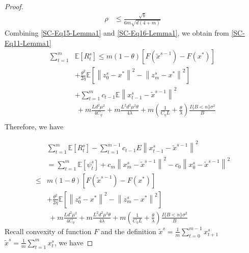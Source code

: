 \documentclass{article}
\newcommand*{\E}{\mathbb{E}}
\newcommand{\norm}[1]{\left\lVert#1\right\rVert}
\theoremstyle{definition}
\theoremstyle{remark}
\begin{document}
{\begin{proof}
{\begin{equation}
\begin{split}
  \rho &\leq \frac{\sqrt{b}}{6m\sqrt{d(4+m)}}
\end{split}
\end{equation}
}
Combining \eqref{SC-Eq15-Lemma1} and \eqref{SC-Eq16-Lemma1},  we obtain from \eqref{SC-Eq11-Lemma1}
\begin{equation}
\begin{split}
\sum_{t=1}^{m} &\E[R_{t}^s]\leq m(1-\theta)[F(\widetilde{x}^{s-1})-F(x^*)] \\
&+ {\frac{ \theta^2}{2\eta}}\E[\norm{z_{0}^s-x^*}^2-\norm{z_{m}^s-x^*}^2]\\
&+ \sum_{t=1}^{m} c_{t-1}\E\norm{x_{t-1}^s-\widetilde{x}^{s-1}}^2\\
&~+m\frac{Ld^2\mu^2}{4C_{\eta}}+m\frac{ L^2d^2\mu^2\theta}{4\lambda}+m(\frac{1}{C_{\eta} L}+\frac{\theta}{\lambda})\frac{I\{B < n\} \sigma ^2}{B}\\
\end{split}
\end{equation}
Therefore, we have

\begin{equation}\label{SC-Eq17-Lemma1}
\begin{split}
&\sum_{t=1}^{m} \E[R_{t}^s]-\sum_{t=1}^{m-1}c_{t-1} E\norm{x_{t-1}^s-\widetilde{x}^{s-1}}^2\\
&= \sum_{t=1}^{m}\E[\psi_{t}^s] + c_{m}\norm{x_{m}^s-\widetilde{x}^{s-1}}^2-c_{0}\norm{x_{0}^s-\widetilde{x}^{s-1}}^2\\
\leq &m(1-\theta)[F(\widetilde{x}^{s-1})-F(x^*)] \\
&+ {\frac{ \theta^2}{2\eta}}\E[\norm{z_{0}^s-x^*}^2-\norm{z_{m}^s-x^*}^2]\\
&~+m\frac{Ld^2\mu^2}{4C_{\eta}}+m\frac{ L^2d^2\mu^2\theta}{4\lambda}+m(\frac{1}{C_{\eta} L}+\frac{\theta}{\lambda})\frac{I\{B < n\} \sigma ^2}{B}
\end{split}
\end{equation}
Recall convexity of function $F$ and the definition $\widetilde{x}^s = \frac{1}{m}\sum_{t=0}^{m-1}x_{t+1}^s$ $\widetilde{x}^s = \frac{1}{m}\sum_{t=1}^{m}x_{t}^s$, we have 


\end{proof}}
\end{document}
